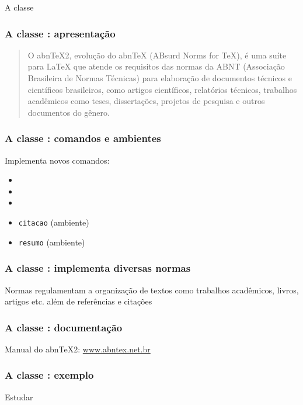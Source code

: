 \begin{frame}[standout]
  \Huge
  A classe 
\end{frame}

\begin{frame}
  \frametitle{A classe : apresentação}
  \large
  \begin{quote}
    O abnTeX2, evolução do abnTeX (ABsurd Norms for TeX), é uma suíte para
    LaTeX que atende os requisitos das normas da ABNT (Associação Brasileira de
    Normas Técnicas) para elaboração de documentos técnicos e científicos
    brasileiros, como artigos científicos, relatórios técnicos, trabalhos
    acadêmicos como teses, dissertações, projetos de pesquisa e outros
    documentos do gênero.
  \end{quote}
\end{frame}

\begin{frame}
  \frametitle{A classe : comandos e ambientes}
  \LARGE
  Implementa novos comandos:

  \begin{itemize}
    \item\texttt{\titulo}
    \item\texttt{\autor}
    \item\texttt{\imprimircapa}
    \item\texttt{citacao} (ambiente)
    \item\texttt{resumo} (ambiente)
  \end{itemize}
\end{frame}

\begin{frame}
  \frametitle{A classe : implementa diversas normas}
  \LARGE
  Normas regulamentam a organização de textos como trabalhos acadêmicos,
  livros, artigos etc. além de referências e citações
\end{frame}

\begin{frame}
  \frametitle{A classe : documentação}
  \LARGE
  Manual do abnTeX2: \url{www.abntex.net.br}
\end{frame}

\begin{frame}
  \frametitle{A classe : exemplo}
  \huge
  Estudar 
\end{frame}
